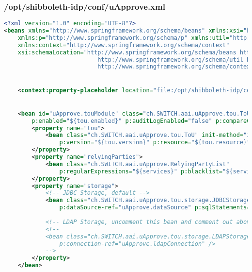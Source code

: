\subsubsection{/opt/shibboleth-idp/conf/uApprove.xml}
\begin{lstlisting}[language=xml]
<?xml version="1.0" encoding="UTF-8"?>
<beans xmlns="http://www.springframework.org/schema/beans" xmlns:xsi="http://www.w3.org/2001/XMLSchema-instance"
    xmlns:p="http://www.springframework.org/schema/p" xmlns:util="http://www.springframework.org/schema/util"
    xmlns:context="http://www.springframework.org/schema/context"
    xsi:schemaLocation="http://www.springframework.org/schema/beans http://www.springframework.org/schema/beans/spring-beans-2.5.xsd
                           http://www.springframework.org/schema/util http://www.springframework.org/schema/util/spring-util-2.5.xsd
                           http://www.springframework.org/schema/context http://www.springframework.org/schema/context/spring-context-2.5.xsd">


    <context:property-placeholder location="file:/opt/shibboleth-idp/conf/uApprove.properties" />


    <bean id="uApprove.touModule" class="ch.SWITCH.aai.uApprove.tou.ToUModule" init-method="initialize"
        p:enabled="${tou.enabled}" p:auditLogEnabled="false" p:compareContent="false">
        <property name="tou">
            <bean class="ch.SWITCH.aai.uApprove.tou.ToU" init-method="initialize"
                p:version="${tou.version}" p:resource="${tou.resource}" />
        </property>
        <property name="relyingParties">
            <bean class="ch.SWITCH.aai.uApprove.RelyingPartyList"
                p:regularExpressions="${services}" p:blacklist="${services.blacklist}" />
        </property>
        <property name="storage">
            <!-- JDBC Storage, default -->
            <bean class="ch.SWITCH.aai.uApprove.tou.storage.JDBCStorage" init-method="initialize"
                p:dataSource-ref="uApprove.dataSource" p:sqlStatements="classpath:/storage/sql-statements.properties" p:graceful="false" />
            
            <!-- LDAP Storage, uncomment this bean and comment out above JDBC bean to activate LDAP -->
            <!--
            <bean class="ch.SWITCH.aai.uApprove.tou.storage.LDAPStorage"
                p:connection-ref="uApprove.ldapConnection" />
            -->
        </property>
    </bean>


\end{lstlisting}
